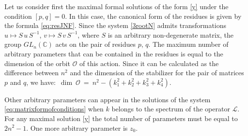 \documentclass{article}
\theoremstyle{plain}
\newcommand{\brackets}[1]{\left( #1 \right)}
\begin{document}
Let us  consider first the maximal formal solutions of the form \eqref{y} under the condition $[p, q]=0$. In this case, the canonical form of the residues is given by the formula \eqref{eq:resJNF}.
Since the system \eqref{3rootN} admits transformations
$u \mapsto S \, u \, S^{-1}$, $v \mapsto S \, v \, S^{-1}$, where $S$ is an arbitrary non-degenerate matrix, the group $GL_n (\mathbb{C})$ acts on the pair of residues $p$, $q$. The maximum number of arbitrary parameters that can be contained in the residues is equal to the dimension of the orbit $\mathcal{O}$ of this action. Since it can be calculated as the difference between $n^2$ and the dimension of the stabilizer for the pair of matrices $p$ and $q$, we have:\, $\dim~\mathcal{O}~=~n^2 - \brackets{k_1^2 + k_2^2 + k_3^2 + k_4^2}$.

Other arbitrary parameters can appear in the solutions of the system \eqref{eq:matrixformofconditions} when $k$ belongs to the spectrum of the operator  $\mathcal{L}$. For any maximal solution \eqref{y} the total number of parameters must be equal to $2 n^2-1$. One more arbitrary parameter is $z_0.$
\end{document}
